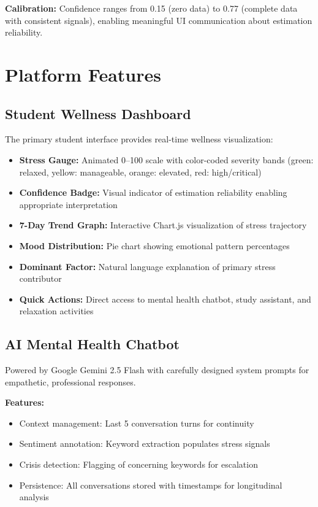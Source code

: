 \documentclass[journal]{IEEEtran}
\begin{document}
\textbf{Calibration:} Confidence ranges from 0.15 (zero data) to 0.77 (complete data with consistent signals), enabling meaningful UI communication about estimation reliability.

\section{Platform Features}
\label{sec:features}

\subsection{Student Wellness Dashboard}

The primary student interface provides real-time wellness visualization:

\begin{itemize}
    \item \textbf{Stress Gauge:} Animated 0--100 scale with color-coded severity bands (green: relaxed, yellow: manageable, orange: elevated, red: high/critical)
    \item \textbf{Confidence Badge:} Visual indicator of estimation reliability enabling appropriate interpretation
    \item \textbf{7-Day Trend Graph:} Interactive Chart.js visualization of stress trajectory
    \item \textbf{Mood Distribution:} Pie chart showing emotional pattern percentages
    \item \textbf{Dominant Factor:} Natural language explanation of primary stress contributor
    \item \textbf{Quick Actions:} Direct access to mental health chatbot, study assistant, and relaxation activities
\end{itemize}

\subsection{AI Mental Health Chatbot}

Powered by Google Gemini 2.5 Flash with carefully designed system prompts for empathetic, professional responses.

\textbf{Features:}
\begin{itemize}
    \item Context management: Last 5 conversation turns for continuity
    \item Sentiment annotation: Keyword extraction populates stress signals
    \item Crisis detection: Flagging of concerning keywords for escalation
    \item Persistence: All conversations stored with timestamps for longitudinal analysis
\end{itemize}
\end{document}
